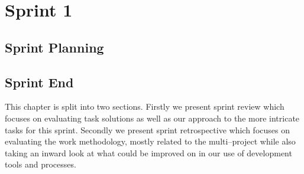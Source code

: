 \part{Sprint 1}
\chapter{Sprint Planning}


\chapter{Sprint End}
This chapter is split into two sections.
Firstly we present sprint review which focuses on evaluating task solutions as well as our approach to the more intricate tasks for this sprint.
Secondly we present sprint retrospective which focuses on evaluating the work methodology, mostly related to the multi--project while also taking an inward look at what could be improved on in our use of development tools and processes.





